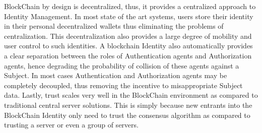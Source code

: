   BlockChain by design is decentralized, thus, it provides a centralized approach to Identity Management. In most state of the art systems, users store their identity in their personal decentralized wallets thus eliminating the problems of centralization. This decentralization also provides a large degree of mobility and user control to such identities. A blockchain Identity also automatically provides a clear separation between the roles of Authentication agents and Authorization agents, hence degrading the probability of collision of these agents against a Subject. In most cases Authentication and Authorization agents may be completely decoupled, thus removing the incentive to misappropriate Subject data. Lastly, trust scales very well in the BlockChain environment as compared to traditional central server solutions. This is simply because new entrants into the BlockChain Identity only need to trust the consensus algorithm as compared to trusting a server or even a group of servers.

